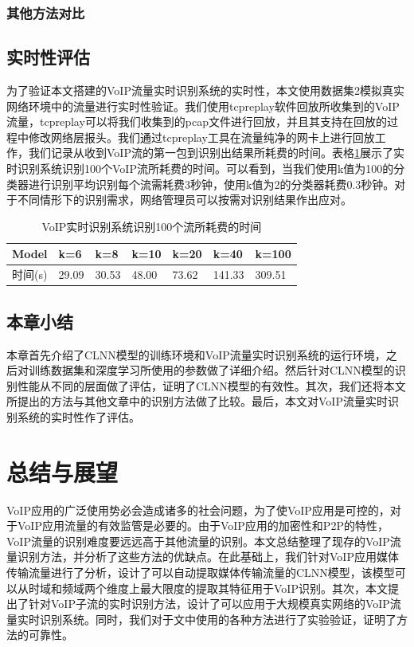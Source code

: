 \subsection{其他方法对比}


\section{实时性评估}
为了验证本文搭建的VoIP流量实时识别系统的实时性，本文使用数据集2模拟真实网络环境中的流量进行实时性验证。我们使用tcpreplay软件回放所收集到的VoIP流量，tcpreplay可以将我们收集到的pcap文件进行回放，并且其支持在回放的过程中修改网络层报头。我们通过tcpreplay工具在流量纯净的网卡上进行回放工作，我们记录从收到VoIP流的第一包到识别出结果所耗费的时间。表格\ref{tab:time4folws}展示了实时识别系统识别100个VoIP流所耗费的时间。可以看到，当我们使用k值为100的分类器进行识别平均识别每个流需耗费3秒钟，使用k值为2的分类器耗费0.3秒钟。对于不同情形下的识别需求，网络管理员可以按需对识别结果作出应对。

\begin{table}
  \caption{VoIP实时识别系统识别100个流所耗费的时间}
  \label{tab:time4folws}
  \centering
  \begin{tabular}{l l l l l l l }
    \hline
    \textbf{Model} &\textbf{k=6}&\textbf{k=8}&\textbf{k=10}&\textbf{k=20}&\textbf{k=40}&\textbf{k=100}\\
    \hline
    时间(s)      &29.09&30.53&48.00&73.62&141.33&309.51  \\
    \hline
  \end{tabular}
\end{table}

\section{本章小结}
本章首先介绍了CLNN模型的训练环境和VoIP流量实时识别系统的运行环境，之后对训练数据集和深度学习所使用的参数做了详细介绍。然后针对CLNN模型的识别性能从不同的层面做了评估，证明了CLNN模型的有效性。其次，我们还将本文所提出的方法与其他文章中的识别方法做了比较。最后，本文对VoIP流量实时识别系统的实时性作了评估。



\chapter{总结与展望}
VoIP应用的广泛使用势必会造成诸多的社会问题，为了使VoIP应用是可控的，对于VoIP应用流量的有效监管是必要的。由于VoIP应用的加密性和P2P的特性，VoIP流量的识别难度要远远高于其他流量的识别。本文总结整理了现存的VoIP流量识别方法，并分析了这些方法的优缺点。在此基础上，我们针对VoIP应用媒体传输流量进行了分析，设计了可以自动提取媒体传输流量的CLNN模型，该模型可以从时域和频域两个维度上最大限度的提取其特征用于VoIP识别。其次，本文提出了针对VoIP子流的实时识别方法，设计了可以应用于大规模真实网络的VoIP流量实时识别系统。同时，我们对于文中使用的各种方法进行了实验验证，证明了方法的可靠性。

